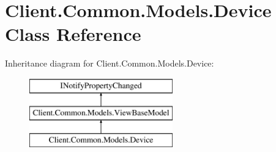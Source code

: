 \hypertarget{classClient_1_1Common_1_1Models_1_1Device}{\section{Client.\-Common.\-Models.\-Device Class Reference}
\label{classClient_1_1Common_1_1Models_1_1Device}
}
Inheritance diagram for Client.\-Common.\-Models.\-Device\-:\begin{figure}[H]
\begin{center}
\leavevmode
\includegraphics[height=3.000000cm]{classClient_1_1Common_1_1Models_1_1Device}
\end{center}
\end{figure}
